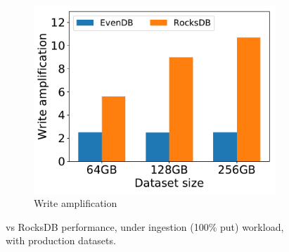 \begin{figure}[tb]
\begin{subfigure}{0.33\linewidth}
\includegraphics[width=\textwidth]{figs/write_amp_256.pdf}
\caption{Write amplification}
\label{fig:prod:ingestion:c}
\end{subfigure}
\caption{\sys\/ vs RocksDB performance, under ingestion (100\% put) workload, with production datasets.}
\label{fig:prod:ingestion}
\end{figure}

